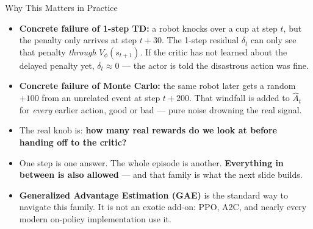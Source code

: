\begin{frame}{Why This Matters in Practice}
\begin{itemize}
    \item \textbf{Concrete failure of 1-step TD:} a robot knocks over a cup at step $t$, but the penalty only arrives at step $t{+}30$. The 1-step residual $\delta_t$ can only see that penalty \emph{through} $V_\phi(s_{t+1})$. If the critic has not learned about the delayed penalty yet, $\delta_t \approx 0$ --- the actor is told the disastrous action was fine.
    \pause
    \item \textbf{Concrete failure of Monte Carlo:} the same robot later gets a random $+100$ from an unrelated event at step $t{+}200$. That windfall is added to $\hat{A}_t$ for \emph{every} earlier action, good or bad --- pure noise drowning the real signal.
    \pause
    \vspace{0.4em}
    \item[$\Rightarrow$] The real knob is: \textbf{how many real rewards do we look at before handing off to the critic?}
    \item One step is one answer. The whole episode is another. \textbf{Everything in between is also allowed} --- and that family is what the next slide builds.
    \item \textbf{Generalized Advantage Estimation (GAE)} is the standard way to navigate this family. It is not an exotic add-on: PPO, A2C, and nearly every modern on-policy implementation use it.
\end{itemize}
\end{frame}
